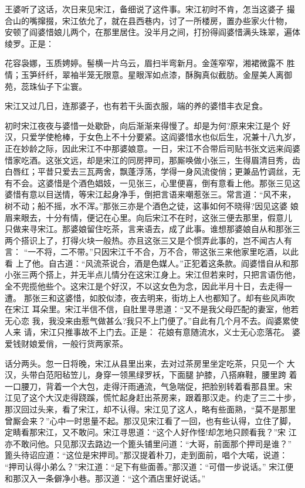 王婆听了这话，次日来见宋江，备细说了这件事。宋江初时不肯，怎当这婆子
撮合山的嘴撺掇，宋江依允了，就在县西巷内，讨了一所楼房，置办些家火什物，
安顿了阎婆惜娘儿两个，在那里居住。没半月之间，打扮得阎婆惜满头珠翠，遍体
绫罗。正是：

花容袅娜，玉质娉婷。髻横一片乌云，眉扫半弯新月。金莲窄窄，湘裙微露不
胜情；玉笋纤纤，翠袖半笼无限意。星眼浑如点漆，酥胸真似截肪。金屋美人离御
苑，蕊珠仙子下尘寰。

宋江又过几日，连那婆子，也有若干头面衣服，端的养的婆惜丰衣足食。

初时宋江夜夜与婆惜一处歇卧，向后渐渐来得慢了。却是为何?原来宋江是个
好汉，只爱学使枪棒，于女色上不十分要紧。这阎婆惜水也似后生，况兼十八九岁，
正在妙龄之际，因此宋江不中那婆娘意。一日，宋江不合带后司贴书张文远来阎婆
惜家吃酒。这张文远，却是宋江的同房押司，那厮唤做小张三，生得眉清目秀，齿
白唇红；平昔只爱去三瓦两舍，飘蓬浮荡，学得一身风流俊俏；更兼品竹调丝，无
有不会。这婆惜是个酒色娼妓，一见张三，心里便喜，倒有意看上他。那张三见这
婆惜有意以目送情，等宋江起身净手，倒把言语来嘲惹张三。常言道：“风不来，
树不动；船不摇，水不浑。”那张三亦是个酒色之徒，这事如何不晓得?因见这婆
娘眉来眼去，十分有情，便记在心里。向后宋江不在时，这张三便去那里，假意儿
只做来寻宋江。那婆娘留住吃茶，言来语去，成了此事。谁想那婆娘自从和那张三
两个搭识上了，打得火块一般热。亦且这张三又是个惯弄此事的，岂不闻古人有言：
“一不将，二不带。”只因宋江千不合，万不合，带这张三来他家里吃酒，以此看
上了他。自古道：“风流茶说合，酒是色媒人。”正犯着这条款。阎婆惜自从和那
小张三两个搭上，并无半点儿情分在这宋江身上。宋江但若来时，只把言语伤他，
全不兜揽他些个。这宋江是个好汉，不以这女色为念，因此半月十日，去走得一遭。
那张三和这婆惜，如胶似漆，夜去明来，街坊上人也都知了。却有些风声吹在宋江
耳朵里。宋江半信不信，自肚里寻思道：“又不是我父母匹配的妻室，他若无心恋
我，我没来由惹气做甚么?我只不上门便了。”自此有几个月不去。阎婆累使人来
请，宋江只推事故不上门去。正是：
花娘有意随流水，义士无心恋落花。
婆爱钱财娘爱俏，一般行货两家茶。

话分两头。忽一日将晚，宋江从县里出来，去对过茶房里坐定吃茶，只见一个
大汉，头带白范阳毡笠儿，身穿一领黑绿罗袄，下面腿护膝，八搭麻鞋，腰里跨
着一口腰刀，背着一个大包，走得汗雨通流，气急喘促，把脸别转着看那县里。宋
江见了这个大汉走得跷蹊，慌忙起身赶出茶房来，跟着那汉走。约走了三二十步，
那汉回过头来，看了宋江，却不认得。宋江见了这人，略有些面熟，“莫不是那里
曾厮会来？”心中一时思量不起。那汉见宋江看了一回，也有些认得，立住了脚，
定睛看那宋江，又不敢问。宋江寻思道：“这个人好作怪!却怎地只顾看我？”宋
江亦不敢问他。只见那汉去路边一个篦头铺里问道：“大哥，前面那个押司是谁？”
篦头待诏应道：“这位是宋押司。”那汉提着朴刀，走到面前，唱个大喏，说道：
“押司认得小弟么？”宋江道：“足下有些面善。”那汉道：“可借一步说话。”
宋江便和那汉入一条僻净小巷。那汉道：“这个酒店里好说话。”


